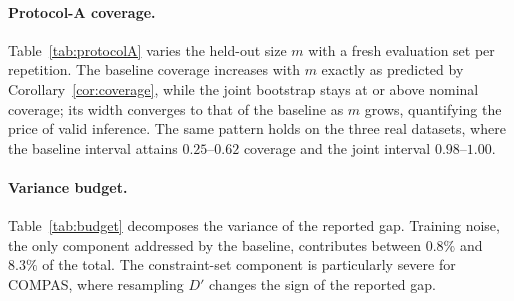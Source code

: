 \documentclass[10pt,twocolumn]{article}
\newcommand{\Dp}{D'}
\begin{document}
\paragraph{Protocol-A coverage.}
Table~\ref{tab:protocolA} varies the held-out size $m$ with a fresh evaluation set per repetition.
The baseline coverage increases with $m$ exactly as predicted by Corollary~\ref{cor:coverage}, while
the joint bootstrap stays at or above nominal coverage; its width converges to that of the baseline
as $m$ grows, quantifying the price of valid inference.  The same pattern holds on the three real
datasets, where the baseline interval attains $0.25$--$0.62$ coverage and the joint interval
$0.98$--$1.00$.

\begin{table}[t]
\centering
\small
\setlength{\tabcolsep}{4pt}
\caption{Protocol-A coverage of the population gap (nominal $0.95$) with a fresh evaluation set in
every repetition.  Synthetic DI: $T=2\times10^4$, $B=100$, 100 repetitions,
$\phi(\theta^*)=0.0212$.  Real data: $T=3\times10^4$, $B=100$, 60 repetitions.}
\label{tab:protocolA}
\end{table}

\paragraph{Variance budget.}
Table~\ref{tab:budget} decomposes the variance of the reported gap.  Training noise, the only
component addressed by the baseline, contributes between $0.8\%$ and $8.3\%$ of the total.  The
constraint-set component is particularly severe for COMPAS, where resampling $\Dp$ changes the sign
of the reported gap.
\end{document}
